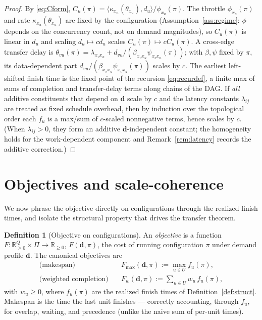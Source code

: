 \documentclass{amsart}
\theoremstyle{definition}
\newtheorem{definition}{Definition}
\begin{document}
\begin{proof}
By \eqref{eq:Cform}, $C_u(\pi)=\langle\kappa_{x_u}(\theta_{x_u}),d_u\rangle/\phi_{x_u}(\pi)$.
The throttle $\phi_{x_u}(\pi)$ and rate $\kappa_{x_u}(\theta_{x_u})$ are fixed
by the configuration (Assumption~\ref{ass:regime}: $\phi$ depends on the
concurrency count, not on demand magnitudes), so $C_u(\pi)$ is linear in $d_u$
and scaling $d_u\mapsto cd_u$ scales $C_u(\pi)\mapsto cC_u(\pi)$. A cross-edge
transfer delay is $\theta_{vu}(\pi)=\lambda_{x_vx_u}+
d_{vu}/(\beta_{x_vx_u}\psi_{x_vx_u}(\pi))$; with $\beta,\psi$ fixed by $\pi$, its
data-dependent part $d_{vu}/(\beta_{x_vx_u}\psi_{x_vx_u}(\pi))$ scales by $c$.
The earliest left-shifted finish time is the fixed point of the recursion
\eqref{eq:recurdef}, a finite max of sums of completion and transfer-delay terms
along chains of the DAG. If \emph{all} additive constituents that depend on
$\mathbf d$ scale by $c$ and the latency constants $\lambda_{ij}$ are treated as
fixed schedule overhead, then by induction over the topological order each
$f_u$ is a max/sum of $c$-scaled nonnegative terms, hence scales by $c$. (When
$\lambda_{ij}>0$, they form an additive $\mathbf d$-independent constant; the
homogeneity holds for the work-dependent component and
Remark~\ref{rem:latency} records the additive correction.)
\end{proof}

\section{Objectives and scale-coherence}\label{sec:objective}

We now phrase the objective directly on configurations through the realized
finish times, and isolate the structural property that drives the transfer
theorem.

\begin{definition}[Objective on configurations]\label{def:obj}
An \emph{objective} is a function $F\colon\mathbb{R}^Q_{\ge0}\times\Pi\to
\mathbb{R}_{\ge0}$, $F(\mathbf d,\pi)$, the cost of running configuration $\pi$
under demand profile $\mathbf d$. The canonical objectives are
\begin{align}
\text{(makespan)}\quad &F_{\max}(\mathbf d,\pi):=\max_{u\in U} f_u(\pi),
\label{eq:makespan}\\
\text{(weighted completion)}\quad &F_{w}(\mathbf d,\pi):=\sum_{u\in U} w_u\, f_u(\pi),
\label{eq:wsum}
\end{align}
with $w_u\ge0$, where $f_u(\pi)$ are the realized finish times of
Definition~\ref{def:struct}. Makespan is the time the last unit finishes —
correctly accounting, through $f_u$, for overlap, waiting, and precedence
(unlike the naive sum of per-unit times).
\end{definition}
\end{document}

